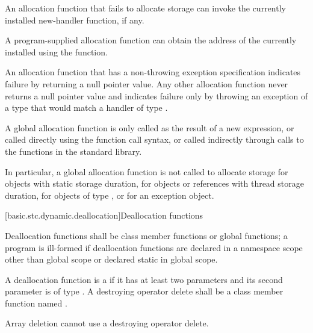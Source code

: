 \pnum
An allocation function that fails to allocate storage can invoke the
currently installed new-handler function, if any.
\begin{note}
%
A program-supplied allocation function can obtain the address of the
currently installed  using the
 function. \end{note}
An allocation function that has a non-throwing
exception specification
indicates failure by returning
a null pointer value.
Any other allocation function
never returns a null pointer value and
indicates failure only by throwing an exception of a type
that would match a handler of type
.

\pnum
A global allocation function is only called as the result of a new
expression, or called directly using the function call
syntax, or called indirectly through calls to the
functions in the \Cpp{} standard library. \begin{note} In particular, a
global allocation function is not called to allocate storage for objects
with static storage duration, for objects or references
with thread storage duration, for objects of
type , or for an
exception object.
\end{note}

[basic.stc.dynamic.deallocation]{Deallocation functions}

\pnum
{}%
Deallocation functions shall be class member functions or global
functions; a program is ill-formed if deallocation functions are
declared in a namespace scope other than global scope or declared static
in global scope.

\pnum
A deallocation function
is a 
if it has at least two parameters
and its second parameter
is of type .
A destroying operator delete
shall be a class member function named .
\begin{note}
Array deletion cannot use a destroying operator delete.
\end{note}

